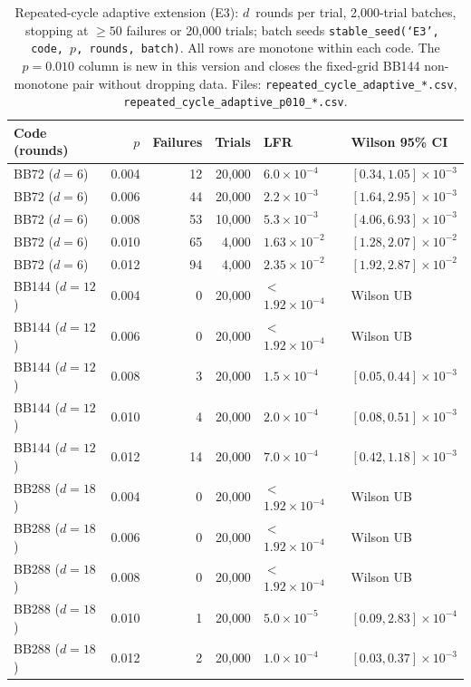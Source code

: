 \documentclass[11pt,a4paper]{article}
\begin{document}
\begin{table}[H]\centering\small
\caption{Repeated-cycle adaptive extension (E3): $d$~rounds per trial,
  2{,}000-trial batches, stopping at $\ge50$ failures or 20{,}000 trials;
  batch seeds \texttt{stable\_seed(`E3',\,code,\,$p$,\,rounds,\,batch)}.
  All rows are monotone within each code. The $p=0.010$ column is new in
  this version and closes the fixed-grid BB144 non-monotone pair without
  dropping data.
  Files: \texttt{repeated\_cycle\_adaptive\_*.csv},
  \texttt{repeated\_cycle\_adaptive\_p010\_*.csv}.}\label{tab:rc_adaptive}
\begin{tabular}{@{}lrrrll@{}}
\toprule
Code (rounds) & $p$ & Failures & Trials & LFR & Wilson 95\% CI \\\midrule
BB72 ($d=6$)   & 0.004 & 12 & 20{,}000 & $6.0\times10^{-4}$ & $[0.34,1.05]\times10^{-3}$ \\
BB72 ($d=6$)   & 0.006 & 44 & 20{,}000 & $2.2\times10^{-3}$ & $[1.64,2.95]\times10^{-3}$ \\
BB72 ($d=6$)   & 0.008 & 53 & 10{,}000 & $5.3\times10^{-3}$ & $[4.06,6.93]\times10^{-3}$ \\
BB72 ($d=6$)   & 0.010 & 65 & 4{,}000  & $1.63\times10^{-2}$ & $[1.28,2.07]\times10^{-2}$ \\
BB72 ($d=6$)   & 0.012 & 94 & 4{,}000  & $2.35\times10^{-2}$ & $[1.92,2.87]\times10^{-2}$ \\\midrule
BB144 ($d=12$) & 0.004 & 0 & 20{,}000 & $<$$1.92\times10^{-4}$ & Wilson UB \\
BB144 ($d=12$) & 0.006 & 0 & 20{,}000 & $<$$1.92\times10^{-4}$ & Wilson UB \\
BB144 ($d=12$) & 0.008 & 3 & 20{,}000 & $1.5\times10^{-4}$ & $[0.05,0.44]\times10^{-3}$ \\
BB144 ($d=12$) & 0.010 & 4 & 20{,}000 & $2.0\times10^{-4}$ & $[0.08,0.51]\times10^{-3}$ \\
BB144 ($d=12$) & 0.012 & 14 & 20{,}000 & $7.0\times10^{-4}$ & $[0.42,1.18]\times10^{-3}$ \\\midrule
BB288 ($d=18$) & 0.004 & 0 & 20{,}000 & $<$$1.92\times10^{-4}$ & Wilson UB \\
BB288 ($d=18$) & 0.006 & 0 & 20{,}000 & $<$$1.92\times10^{-4}$ & Wilson UB \\
BB288 ($d=18$) & 0.008 & 0 & 20{,}000 & $<$$1.92\times10^{-4}$ & Wilson UB \\
BB288 ($d=18$) & 0.010 & 1 & 20{,}000 & $5.0\times10^{-5}$ & $[0.09,2.83]\times10^{-4}$ \\
BB288 ($d=18$) & 0.012 & 2 & 20{,}000 & $1.0\times10^{-4}$ & $[0.03,0.37]\times10^{-3}$ \\
\bottomrule
\end{tabular}
\end{table}
\end{document}
